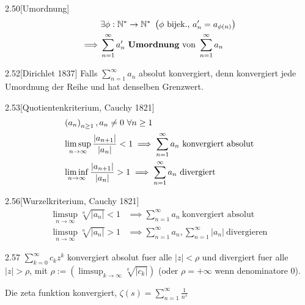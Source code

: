 \begin{definition}{2.50}[Umordnung]
    \begin{align*}
         & \exists \phi: \N^* \to \N^*\ \left( \phi\ \mbox{bijek.,}\ a'_n = a_{\phi(n)} \right) \\
        \implies
         & \sum_{n=1}^\infty a'_n\ \mbox{\textbf{Umordnung} von}\ \sum_{n=1}^\infty a_n
    \end{align*}
\end{definition}

\begin{satz}{2.52}[Dirichlet 1837]
    Falls $\sum_{n=1}^\infty a_n$ absolut konvergiert, denn konvergiert jede Umordnung der Reihe und hat denselben Grenzwert.
\end{satz}

\begin{satz}{2.53}[Quotientenkriterium, Cauchy 1821]
    \begin{align*}
         & \left( a_n \right)_{n \ge 1}, a_n \ne 0\ \forall n \ge 1                                                                           \\
         & \limsup_{n \to \infty} \frac{|a_{n+1}|}{|a_n|} < 1 \implies \sum_{n=1}^\infty a_n\ \mbox{konvergiert absolut} \\
         & \liminf_{n \to \infty} \frac{|a_{n+1}|}{|a_n|} > 1 \implies \sum_{n=1}^\infty a_n\ \mbox{divergiert}
    \end{align*}
\end{satz}

\begin{satz}{2.56}[Wurzelkriterium, Cauchy 1821]
    \begin{align*}
        \limsup_{n \to \infty} \sqrt[n]{|a_n|} < 1 & \implies \sum_{n=1}^\infty a_n\ \mbox{konvergiert absolut}                  \\
        \limsup_{n \to \infty} \sqrt[n]{|a_n|} > 1 & \implies \sum_{n=1}^\infty a_n, \sum_{n=1}^\infty |a_n|\ \mbox{divergieren}
    \end{align*}
\end{satz}

\begin{korollar}{2.57}
    $\sum_{k=0}^\infty c_k z^k$ konvergiert absolut fuer alle $|z| < \rho$ und divergiert fuer alle $|z| > \rho$,
    mit $\rho := \left( \limsup_{k \to \infty} \sqrt[k]{|c_k|} \right)$ (oder $\rho = +\infty$ wenn denominatore 0).
\end{korollar}

\begin{korollar}{}
    Die zeta funktion konvergiert, $\zeta(s) = \sum_{n=1}^\infty \frac{1}{n^s}$
\end{korollar}


